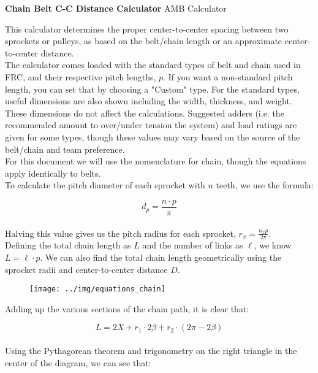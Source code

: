 \documentclass[a4paper]{article}
\begin{document}
	
	\Huge\textbf{Chain Belt C-C Distance Calculator}
	\newline
	\LARGE AMB Calculator
	
	\vspace{0.5cm}
	\normalsize
	
	This calculator determines the proper center-to-center spacing between two sprockets or pulleys, as based on the belt/chain length or an approximate center-to-center distance.\\
	
	The calculator comes loaded with the standard types of belt and chain used in FRC, and their respective pitch lengths, $ p $. If you want a non-standard pitch length, you can set that by choosing a "Custom" type. For the standard types, useful dimensions are also shown including the width, thickness, and weight. These dimensions do not affect the calculations. Suggested adders (i.e. the recommended amount to over/under tension the system) and load ratings are given for some types, though these values may vary based on the source of the belt/chain and team preference.\\
	
	For this document we will use the nomenclature for chain, though the equations apply identically to belts.\\
	
	To calculate the pitch diameter of each sprocket with $ n $ teeth, we use the formula:
	
	\begin{equation}
		d_p = \frac{n \cdot p}{\pi}
	\end{equation}
	\\
	Halving this value gives us the pitch radius for each sprocket, $ r_x = \frac{n_x p}{2\pi} $.\\
	
	Defining the total chain length as $ L $ and the number of links as $ \ell $, we know $ L = \ell \cdot p $. We can also find the total chain length geometrically using the sprocket radii and center-to-center distance $ D $.
	
	\begin{figure}[H]
		\centering
		\texttt{[image: ../img/equations\_chain]}
	\end{figure}

	Adding up the various sections of the chain path, it is clear that:
	
	\begin{equation} \label{Lbase}
		L = 2X + r_1 \cdot 2\beta + r_2 \cdot \left( 2\pi - 2\beta \right)
	\end{equation}
	\\
	Using the Pythagorean theorem and trigonometry on the right triangle in the center of the diagram, we can see that:
	
\end{document}
